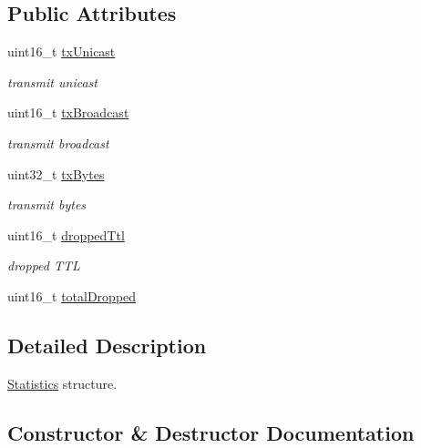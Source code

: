 \subsection*{Public Attributes}
\begin{DoxyCompactItemize}
\item 
uint16\+\_\+t \hyperlink{structns3_1_1flame_1_1FlameProtocol_1_1Statistics_ac982655d8d0713a26f8844b982c2e84e}{tx\+Unicast}
\begin{DoxyCompactList}\small\item\em transmit unicast \end{DoxyCompactList}\item 
uint16\+\_\+t \hyperlink{structns3_1_1flame_1_1FlameProtocol_1_1Statistics_a0ba404c358cf7b3dda7eef14e20ddeac}{tx\+Broadcast}
\begin{DoxyCompactList}\small\item\em transmit broadcast \end{DoxyCompactList}\item 
uint32\+\_\+t \hyperlink{structns3_1_1flame_1_1FlameProtocol_1_1Statistics_a6e9193135a5ce66fc2195afe99118bb9}{tx\+Bytes}
\begin{DoxyCompactList}\small\item\em transmit bytes \end{DoxyCompactList}\item 
uint16\+\_\+t \hyperlink{structns3_1_1flame_1_1FlameProtocol_1_1Statistics_aa8bce610a8fb9ff1989ee347fdc32120}{dropped\+Ttl}
\begin{DoxyCompactList}\small\item\em dropped T\+TL \end{DoxyCompactList}\item 
uint16\+\_\+t \hyperlink{structns3_1_1flame_1_1FlameProtocol_1_1Statistics_a9bbb45f9d30c589661435636b6065ef7}{total\+Dropped}
\end{DoxyCompactItemize}


\subsection{Detailed Description}
\hyperlink{structns3_1_1flame_1_1FlameProtocol_1_1Statistics}{Statistics} structure. 

\subsection{Constructor \& Destructor Documentation}
